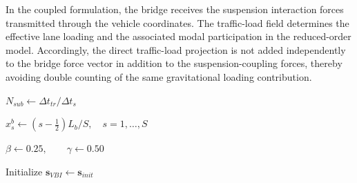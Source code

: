 \documentclass[journal]{IEEEtran}
\begin{document}
In the coupled formulation, the bridge receives the suspension
interaction forces transmitted through the vehicle coordinates.
The traffic-load field determines the effective lane loading and
the associated modal participation in the reduced-order model.
Accordingly, the direct traffic-load projection is not added
independently to the bridge force vector in addition to the
suspension-coupling forces, thereby avoiding double counting
of the same gravitational loading contribution.


\begin{algorithm}[!htbp]
\caption{Multirate Traffic-to-Structure VBI Response Computation}
\label{alg:vbi_response}
\scriptsize



$N_{sub}\leftarrow \Delta t_{tr}/\Delta t_s$\;

$x_s^b\leftarrow
\left(s-\frac{1}{2}\right)L_b/S,
\quad s=1,\ldots,S$\;

$\beta\leftarrow0.25,\qquad\gamma\leftarrow0.50$\;

Initialize
$\mathbf{s}_{VBI}\leftarrow\mathbf{s}_{init}$\;


\end{algorithm}
\end{document}
